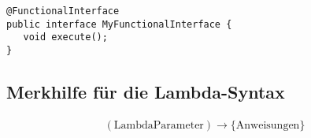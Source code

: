 \documentclass[12pt, oneside]{article}
\begin{document}
\begin{listing}[ht]
\begin{verbatim}
@FunctionalInterface
public interface MyFunctionalInterface {
   void execute();
}
\end{verbatim}
\end{listing}

\subsection*{Merkhilfe für die Lambda-Syntax}
\begin{align*}
	(\text{LambdaParameter}) \rightarrow \{\text{Anweisungen}\}
\end{align*}
\end{document}
